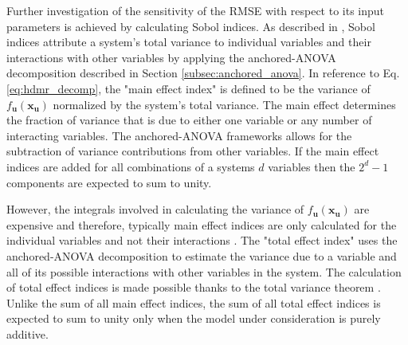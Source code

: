 Further investigation of the sensitivity of the \ac{RMSE} with respect to its input parameters is achieved by calculating Sobol indices. As described in \cite{Sobol}, Sobol indices attribute a system's total variance to individual variables and their interactions with other variables by applying the anchored-\ac{ANOVA} decomposition described in Section \ref{subsec:anchored_anova}. In reference to Eq. \ref{eq:hdmr_decomp}, the "main effect index" is defined to be the variance of $f_\textbf{u}\left(\textbf{x}_\textbf{u}\right)$ normalized by the system's total variance. The main effect determines the fraction of variance that is due to either one variable or any number of interacting variables. The anchored-\ac{ANOVA} frameworks allows for the subtraction of variance contributions from other variables. If the main effect indices are added for all combinations of a systems $d$ variables then the $2^d-1$ components are expected to sum to unity. 

However, the integrals involved in calculating the variance of $f_\textbf{u}\left(\textbf{x}_\textbf{u}\right)$ are expensive and therefore, typically main effect indices are only calculated for the individual variables and not their interactions \cite{Saltelli}. The "total effect index" uses the anchored-\ac{ANOVA} decomposition to estimate the variance due to a variable and all of its possible interactions with other variables in the system. The calculation of total effect indices is made possible thanks to the total variance theorem \cite{Saltelli}. Unlike the sum of all main effect indices, the sum of all total effect indices is expected to sum to unity only when the model under consideration is purely additive.  

